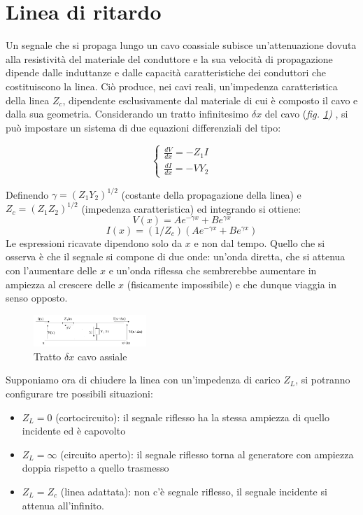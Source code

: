 \documentclass[journal]{IEEEtran}
\begin{document}
\section{Linea di ritardo} %

Un segnale che si propaga lungo un cavo coassiale subisce un'attenuazione dovuta alla resistività del materiale del conduttore e la sua velocità di propagazione dipende dalle induttanze e dalle capacità caratteristiche dei conduttori che costituiscono la linea. Ciò produce, nei cavi reali, un'impedenza caratteristica della linea $Z_c$, dipendente esclusivamente dal materiale di cui è composto il cavo e dalla sua geometria.
Considerando un tratto infinitesimo $\delta x$ del cavo (\textit{fig. \ref{fig:coassiale}) }, si può impostare un sistema di due equazioni differenziali del tipo:


\[\begin{cases}
  \frac{dV}{dx} = -Z_1 I \\
  \frac{dI}{dx} = -V Y_2 
\end{cases} \tag{1} \]

Definendo $\gamma = (Z_1 Y_2)^{1/2}$ (costante della propagazione della linea) e $Z_c = (Z_1 Z_2)^{1/2}$ (impedenza caratteristica) ed integrando si ottiene:
\[ V(x) = Ae^{-\gamma x} + Be^{\gamma x} \tag{2}\]
\[ I(x) = (1/Z_c)(Ae^{-\gamma x} + Be^{\gamma x}) \tag{3}\]
Le espressioni ricavate dipendono solo da $x$ e non dal tempo. 
Quello che si osserva è che il segnale si compone di due onde: un'onda diretta, che si attenua con l'aumentare delle $x$ e un'onda riflessa che sembrerebbe aumentare in ampiezza al crescere delle $x$ (fisicamente impossibile) e che dunque viaggia in senso opposto.

\begin{figure}[H]%
\begin {center}
\includegraphics[width=0.38\textwidth]{analysis/output/cavo coassiale.png}
\caption{Tratto $\delta x$ cavo assiale}
\label{fig:coassiale}
\end {center}
\end{figure}

Supponiamo ora di chiudere la linea con un'impedenza di carico $Z_L$, si potranno configurare tre possibili situazioni: 
\begin{itemize}
    \item $Z_L = 0$ (cortocircuito): il segnale riflesso ha la stessa ampiezza di quello incidente ed è capovolto
    \item $Z_L = \infty$ (circuito aperto): il segnale riflesso torna al generatore con ampiezza doppia rispetto a quello trasmesso
    \item $Z_L = Z_c$ (linea adattata): non c'è segnale riflesso, il segnale incidente si attenua all'infinito.
\end{itemize}
\end{document}
